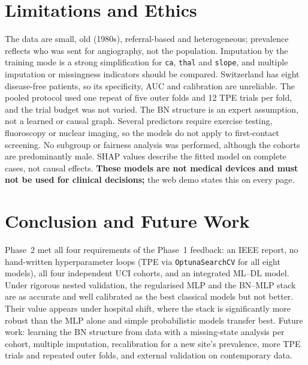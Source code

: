 \documentclass[conference]{IEEEtran}
\newcommand{\code}[1]{\texttt{\small #1}}
\begin{document}
\section{Limitations and Ethics}
The data are small, old (1980s), referral-based and heterogeneous; prevalence reflects who was sent for angiography, not the population. Imputation by the training mode is a strong simplification for \code{ca}, \code{thal} and \code{slope}, and multiple imputation or missingness indicators should be compared. Switzerland has eight disease-free patients, so its specificity, AUC and calibration are unreliable. The pooled protocol used one repeat of five outer folds and 12 TPE trials per fold, and the trial budget was not varied. The BN structure is an expert assumption, not a learned or causal graph. Several predictors require exercise testing, fluoroscopy or nuclear imaging, so the models do not apply to first-contact screening. No subgroup or fairness analysis was performed, although the cohorts are predominantly male. SHAP values describe the fitted model on complete cases, not causal effects. \textbf{These models are not medical devices and must not be used for clinical decisions;} the web demo states this on every page.

\section{Conclusion and Future Work}
Phase~2 met all four requirements of the Phase~1 feedback: an IEEE report, no hand-written hyperparameter loops (TPE via \code{OptunaSearchCV} for all eight models), all four independent UCI cohorts, and an integrated ML--DL model. Under rigorous nested validation, the regularised MLP and the BN--MLP stack are as accurate and well calibrated as the best classical models but not better. Their value appears under hospital shift, where the stack is significantly more robust than the MLP alone and simple probabilistic models transfer best. Future work: learning the BN structure from data with a missing-state analysis per cohort, multiple imputation, recalibration for a new site's prevalence, more TPE trials and repeated outer folds, and external validation on contemporary data.
\end{document}
